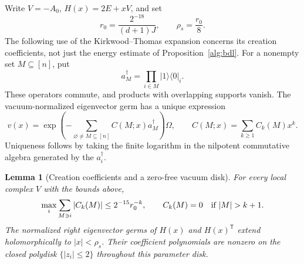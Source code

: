\documentclass[reqno]{amsart}
\newtheorem{lemma}[theorem]{Lemma}
\theoremstyle{definition}
\theoremstyle{remark}
\begin{document}
Write \(V=-A_0\), \(H(x)=2E+xV\), and set
\begin{equation}\label{alg:state-radii}
 r_0=\frac{2^{-18}}{(d+1)J},\qquad \rho_s=\frac{r_0}{8}.
\end{equation}
The following use of the Kirkwood--Thomas expansion concerns its
creation coefficients, not just the energy estimate of
Proposition~\ref{alg:bdl}.
For a nonempty set \(M\subseteq[n]\), put
\[
 a_M^\dagger=\prod_{i\in M}|1\rangle\langle0|_i .
\]
These operators commute, and products with overlapping supports vanish.
The vacuum-normalized eigenvector germ has a unique expression
\[
 v(x)=\exp\left(-\sum_{\varnothing\ne M\subseteq[n]}
                   C(M;x)a_M^\dagger\right)\Omega,
 \qquad C(M;x)=\sum_{k\ge1}C_k(M)x^k.
\]
Uniqueness follows by taking the finite logarithm in the nilpotent
commutative algebra generated by the \(a_i^\dagger\).

\begin{lemma}[Creation coefficients and a zero-free vacuum disk]
\label{alg:creation-disk}
For every local complex \(V\) with the bounds above,
\begin{equation}\label{alg:creation-bound}
 \max_i\sum_{M\ni i}|C_k(M)|\le2^{-15}r_0^{-k},
 \qquad C_k(M)=0\quad\hbox{if }|M|>k+1.
\end{equation}
The normalized right eigenvector germs of \(H(x)\) and
\(H(x)^{\mathsf T}\) extend holomorphically to \(|x|<\rho_s\).
Their coefficient polynomials are nonzero on the closed polydisk
\(\{|z_i|\le2\}\) throughout this parameter disk.
\end{lemma}
\end{document}
